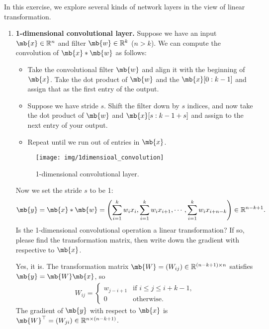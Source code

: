 \begin{exercise}
    In this exercise, we explore several kinds of network layers in the view of linear transformation.
    \begin{enumerate}
        \item \textbf{1-dimensional convolutional layer.} Suppose we have an input $\mb{x}\in\mathbb{R}^n$ and filter $\mb{w}\in\mathbb{R}^k$ ($n>k$). We can compute the convolution of $\mb{x}\ast \mb{w}$ as follows:
            \begin{itemize}
                \item Take the convolutional filter $\mb{w}$ and align it with the beginning of $\mb{x}$. Take the dot product of $\mb{w}$ and the $\mb{x}[0 : k -1]$ and assign that as the first entry of the output.
                \item Suppose we have stride $s$. Shift the filter down by $s$ indices, and now take the dot product of $\mb{w}$ and $\mb{x}[s : k - 1 +s]$ and assign to the next entry of your output.
                \item Repeat until we run out of entries in $\mb{x}$.
            \end{itemize}

            \begin{figure}[H]
                \centering
                \texttt{[image: img/1dimensioal\_convolution]}
                \caption{1-dimensional convolutional layer.}
            \end{figure}

            Now we set the stride $s$ to be 1:
            \begin{align*}
                \mb{y}=\mb{x}\ast \mb{w}=\left(\sum_{i=1}^kw_ix_i,\sum_{i=1}^kw_ix_{i+1},\cdots, \sum_{i=1}^kw_ix_{i+n-k}\right)\in\mathbb{R}^{n-k+1}.
            \end{align*}
            Is the 1-dimensional convolutional operation a linear transformation? If so, please find the transformation matrix, then write down the gradient with respective to $\mb{x}$.

            \begin{solution}
                Yes, it is. The transformation matrix $\mb{W} = (W_{ij}) \in \mathbb{R}^{(n-k+1) \times n}$ satisfies $\mb{y} = \mb{W}\mb{x}$, so
                \begin{align*}
                    W_{ij} = \begin{cases}
                                 w_{j-i+1} & \text{if } i \le j \le i + k - 1, \\
                                 0         & \text{otherwise}.
                             \end{cases}
                \end{align*}
                The gradient of $\mb{y}$ with respect to $\mb{x}$ is $\mb{W}^\top = (W_{ji})\in \mathbb{R}^{n \times (n-k+1)}$.
            \end{solution}



\end{enumerate}
\end{exercise}
